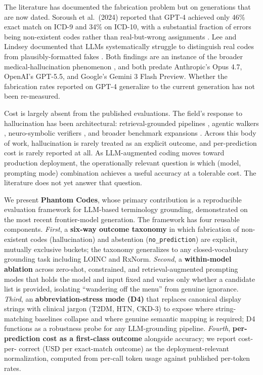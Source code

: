 The literature has documented the fabrication problem but on
generations that are now dated. Soroush et al.\ (2024) reported
that GPT-4 achieved only 46\% exact match on ICD-9 and 34\% on
ICD-10, with a substantial fraction of errors being non-existent
codes rather than real-but-wrong assignments
\autocite{Soroush2024}. Lee and Lindsey documented that LLMs
systematically struggle to distinguish real codes from
plausibly-formatted fakes \autocite{Lee2024}. Both findings are an
instance of the broader medical-hallucination phenomenon
\autocite{Kim2025,Ji2023}, and both predate Anthropic's Opus 4.7,
OpenAI's GPT-5.5, and Google's Gemini 3 Flash Preview. Whether the
fabrication rates reported on GPT-4 generalize to the current
generation has not been re-measured.

Cost is largely absent from the published evaluations. The field's
response to hallucination has been architectural: retrieval-grounded
pipelines \autocite{DasBaksi2024,Sarvari2025}, agentic walkers
\autocite{Motzfeldt2025}, neuro-symbolic verifiers
\autocite{HybridCode2025}, and broader benchmark expansions
\autocite{Almeida2025,Singh2025,Li2025,Gershon2025}. Across this
body of work, hallucination is rarely treated as an explicit
outcome, and per-prediction cost is rarely reported at all. As
LLM-augmented coding moves toward production deployment, the
operationally relevant question is which (model, prompting mode)
combination achieves a useful accuracy at a tolerable cost. The
literature does not yet answer that question.

We present \textbf{Phantom Codes}, whose primary contribution is a
reproducible evaluation framework for LLM-based terminology
grounding, demonstrated on the most recent frontier-model
generation. The framework has four reusable components. \emph{First},
a \textbf{six-way outcome taxonomy} in which fabrication of
non-existent codes (hallucination) and abstention
(\texttt{no\_prediction}) are explicit, mutually exclusive buckets;
the taxonomy generalizes to any closed-vocabulary grounding task
including LOINC and RxNorm. \emph{Second}, a \textbf{within-model
ablation} across zero-shot, constrained, and retrieval-augmented
prompting modes that holds the model and input fixed and varies
only whether a candidate list is provided, isolating ``wandering
off the menu'' from genuine ignorance. \emph{Third}, an
\textbf{abbreviation-stress mode (D4)} that replaces canonical
display strings with clinical jargon (T2DM, HTN, CKD-3) to expose
where string-matching baselines collapse and where genuine semantic
mapping is required; D4 functions as a robustness probe for any
LLM-grounding pipeline. \emph{Fourth}, \textbf{per-prediction cost
as a first-class outcome} alongside accuracy; we report cost-per-
correct (USD per exact-match outcome) as the deployment-relevant
normalization, computed from per-call token usage against published
per-token rates.

